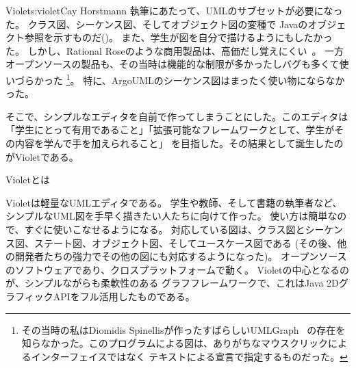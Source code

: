 \begin{aosachapter}{Violet}{s:violet}{Cay Horstmann}
執筆にあたって、UMLのサブセットが必要になった。
クラス図、シーケンス図、そしてオブジェクト図の変種で
Javaのオブジェクト参照を示すものだ()。
また、学生が図を自分で描けるようにもしたかった。
しかし、Rational Roseのような商用製品は、高価だし覚えにくい~\cite{bib:shumba:ratrose}。
一方オープンソースの製品も、その当時は機能的な制限が多かったしバグも多くて使いづらかった
\footnote{その当時の私はDiomidis Spinellisが作ったすばらしいUMLGraph~\cite{bib:spinellis:umlgraph}
の存在を知らなかった。このプログラムによる図は、ありがちなマウスクリックによるインターフェイスではなく
テキストによる宣言で指定するものだった。}。
特に、ArgoUMLのシーケンス図はまったく使い物にならなかった。

そこで、シンプルなエディタを自前で作ってしまうことにした。このエディタは
「学生にとって有用であること」「拡張可能なフレームワークとして、学生がその内容を学んで手を加えられること」
を目指した。その結果として誕生したのがVioletである。

\begin{aosasect1}{Violetとは}

Violetは軽量なUMLエディタである。
学生や教師、そして書籍の執筆者など、
シンプルなUML図を手早く描きたい人たちに向けて作った。
使い方は簡単なので、すぐに使いこなせるようになる。
対応している図は、クラス図とシーケンス図、ステート図、オブジェクト図、そしてユースケース図である
(その後、他の開発者たちの強力でその他の図にも対応するようになった)。
オープンソースのソフトウェアであり、クロスプラットフォームで動く。
Violetの中心となるのが、シンプルながらも柔軟性のある
グラフフレームワークで、これはJava 2DグラフィックAPIをフル活用したものである。


\end{aosasect1}
\end{aosachapter}
